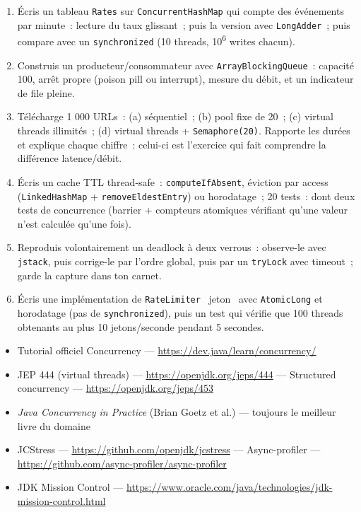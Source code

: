 \documentclass[12pt,a4paper,twoside,openright]{book}
\begin{document}
\begin{exercice}
\begin{enumerate}
  \item \'Ecris un tableau \verb|Rates| sur \verb|ConcurrentHashMap| qui compte des \'ev\'enements par
        minute~: lecture du taux glissant~; puis la version avec \verb|LongAdder|~; puis compare
        avec un \verb|synchronized| (10 threads, 10\textsuperscript{6} writes chacun).
  \item Construis un producteur/consommateur avec \verb|ArrayBlockingQueue|~: capacit\'e 100,
        arr\^et propre (poison pill ou interrupt), mesure du d\'ebit, et un indicateur de file pleine.
  \item T\'el\'echarge 1 000 URLs~: (a) s\'equentiel~; (b) pool fixe de 20~; (c) virtual threads
        illimit\'es~; (d) virtual threads + \verb|Semaphore(20)|. Rapporte les dur\'ees et explique
        chaque chiffre~: celui-ci est l'exercice qui fait comprendre la diff\'erence latence/d\'ebit.
  \item \'Ecris un cache TTL thread-safe~: \verb|computeIfAbsent|, \'eviction par access
        (\verb|LinkedHashMap| + \verb|removeEldestEntry|) ou horodatage~; 20 tests~: dont deux
        tests de concurrence (barrier + compteurs atomiques v\'erifiant qu'une valeur n'est calcul\'ee
        qu'une fois).
  \item Reproduis volontairement un deadlock \`a deux verrous~: observe-le avec \verb|jstack|, puis
        corrige-le par l'ordre global, puis par un \verb|tryLock| avec timeout~; garde la capture
        dans ton carnet.
  \item \'Ecris une impl\'ementation de \verb|RateLimiter| \og ~jeton~ \fg{} avec \verb|AtomicLong| et
        horodatage (pas de \verb|synchronized|), puis un test qui v\'erifie que 100 threads
        obtenants au plus 10 jetons/seconde pendant 5 secondes.
\end{enumerate}
\end{exercice}

\begin{ressources}
\begin{itemize}
  \item Tutorial officiel Concurrency --- \url{https://dev.java/learn/concurrency/}
  \item JEP 444 (virtual threads) --- \url{https://openjdk.org/jeps/444} --- Structured concurrency --- \url{https://openjdk.org/jeps/453}
  \item \emph{Java Concurrency in Practice} (Brian Goetz et al.) --- toujours le meilleur livre du domaine
  \item JCStress --- \url{https://github.com/openjdk/jcstress} --- Async-profiler --- \url{https://github.com/async-profiler/async-profiler}
  \item JDK Mission Control --- \url{https://www.oracle.com/java/technologies/jdk-mission-control.html}
\end{itemize}
\end{ressources}
\end{document}
